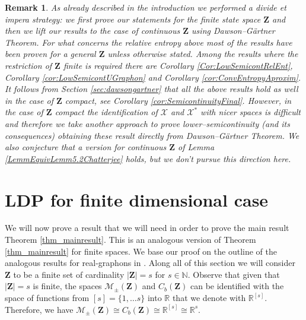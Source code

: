 \documentclass[12pt,twoside,a4paper]{article}
\newtheorem{remark}[theorem]{Remark}
\def\N{\mathbb{N}}
\newcommand{\Space}{\mathbf{Z}}
\newcommand{\CbFunct}{C_b(\Space)}
\begin{document}
\begin{remark}\label{rem:continousSpace}
As already described in the introduction we performed a \emph{divide et impera} strategy: we first prove our statements for the finite state space $\Space$ and then we lift our results to the case of continuous $\Space$ using Dawson--G\"artner Theorem. For what concerns the relative entropy above most of the results have been proven for a general $\Space$ unless otherwise stated. Among the results where the restriction of $\Space$ finite is required there are Corollary \ref{Cor:LowSemicontRelEnt}, Corollary \ref{cor:LowSemicontUGraphon} and Corollary \ref{cor:ConvEntropyAproxim}. It follows from Section \ref{sec:dawsongartner} that all the above results hold as well in the case of $\Space$ compact, see Corollary \ref{cor:SemicontinuityFinal}. However, in the case of $\Space$ compact the identification of $\mathcal{X}$ and $\mathcal{X}^*$ with nicer spaces is difficult and therefore we take another approach to prove lower--semicontinuity (and its consequences) obtaining these result directly from Dawson--G\"artner Theorem. We also conjecture that a version for continuous $\Space$ of Lemma \ref{LemmEquivLemm5.2Chatterjee} holds, but we don't pursue this direction here.
\end{remark}

\section{LDP for finite dimensional case}
\label{Sec:LDP_finite}
We will now prove a result that we will need in order to prove the main result Theorem \ref{thm_mainresult}. This is an analogous version of Theorem \ref{thm_mainresult} for finite spaces. We base our proof on the outline of the analogous results for real-graphons in \cite{ChatterjeeVaradhan2011,chatterjee2017large}. Along all of this section we will consider $\Space$ to be a finite set of cardinality $|\Space|=s$ for $s\in \N$. Observe that given that $|\Space|=s$ is finite, the spaces $\mathcal{M}_{\pm}(\Space)$ and $\CbFunct$ can be identified with the space of functions from $[s]=\{1,\ldots s\}$ into $\mathbb{R}$ that we denote with $\mathbb{R}^{[s]}.$ Therefore, we have $\mathcal{M}_{\pm}(\Space)\cong \CbFunct \cong \mathbb{R}^{[s]}\cong \mathbb{R}^{s}.$    
\end{document}

